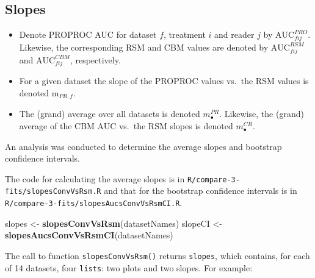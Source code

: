 \documentclass[
]{book}
\newenvironment{Shaded}{\begin{snugshade}}{\end{snugshade}}
\newcommand{\KeywordTok}[1]{\textcolor[rgb]{0.13,0.29,0.53}{\textbf{#1}}}
\newcommand{\NormalTok}[1]{#1}
\newcommand{\StringTok}[1]{\textcolor[rgb]{0.31,0.60,0.02}{#1}}
\begin{document}
\hypertarget{rsm-3-fits-slopes}{%
\subsection{Slopes}\label{rsm-3-fits-slopes}}

\begin{itemize}
\item
  Denote PROPROC AUC for dataset \(f\), treatment \(i\) and reader \(j\) by \(\text{AUC}^{PRO}_{fij}\). Likewise, the corresponding RSM and CBM values are denoted by \(\text{AUC}^{RSM}_{fij}\) and \(\text{AUC}^{CBM}_{fij}\), respectively.
\item
  For a given dataset the slope of the PROPROC values vs.~the RSM values is denoted \(\text{m}_{PR,f}\).
\item
  The (grand) average over all datasets is denoted \(m^{PR}_\bullet\). Likewise, the (grand) average of the CBM AUC vs.~the RSM slopes is denoted \(m^{CR}_\bullet\).
\end{itemize}

An analysis was conducted to determine the average slopes and bootstrap confidence intervals.

The code for calculating the average slopes is in \texttt{R/compare-3-fits/slopesConvVsRsm.R} and that for the bootstrap confidence intervals is in \texttt{R/compare-3-fits/slopesAucsConvVsRsmCI.R}.

\begin{Shaded}
\begin{Highlighting}[]
\NormalTok{slopes <-}\StringTok{ }\KeywordTok{slopesConvVsRsm}\NormalTok{(datasetNames)}
\NormalTok{slopeCI <-}\StringTok{ }\KeywordTok{slopesAucsConvVsRsmCI}\NormalTok{(datasetNames)}
\end{Highlighting}
\end{Shaded}

The call to function \texttt{slopesConvVsRsm()} returns \texttt{slopes}, which contains, for each of 14 datasets, four \texttt{lists}: two plots and two slopes. For example:
\end{document}
